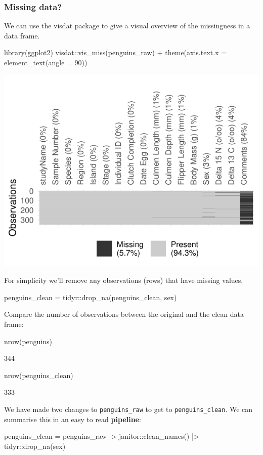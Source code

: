 \documentclass[a4paper]{article}
\begin{document}
\subsubsection{Missing data?}
We can use the visdat package to give a visual overview of the missingness in a data frame.
\begin{Schunk}
\begin{Sinput}
library(ggplot2)
visdat::vis_miss(penguins_raw) + theme(axis.text.x = element_text(angle = 90))
\end{Sinput}


{\centering \includegraphics[width=\maxwidth]{figure/listings-par_mar_c_2_2_2_2__-1} 

}

\end{Schunk}
For simplicity we'll remove any observations (rows) that have missing values.
\begin{Schunk}
\begin{Sinput}
penguins_clean = tidyr::drop_na(penguins_clean, sex)
\end{Sinput}
\end{Schunk}
Compare the number of observations between the original and the clean data frame:
\begin{Schunk}
\begin{Sinput}
nrow(penguins)
\end{Sinput}
\begin{Soutput}
[1] 344
\end{Soutput}
\end{Schunk}
\begin{Schunk}
\begin{Sinput}
nrow(penguins_clean)
\end{Sinput}
\begin{Soutput}
[1] 333
\end{Soutput}
\end{Schunk}
We have made two changes to \lstinline|penguins_raw| to get to \lstinline|penguins_clean|. We can summarise this in an easy to read \textbf{pipeline}:
\begin{Schunk}
\begin{Sinput}
penguins_clean = penguins_raw |>
  janitor::clean_names() |>
  tidyr::drop_na(sex)
\end{Sinput}
\end{Schunk}
\end{document}

